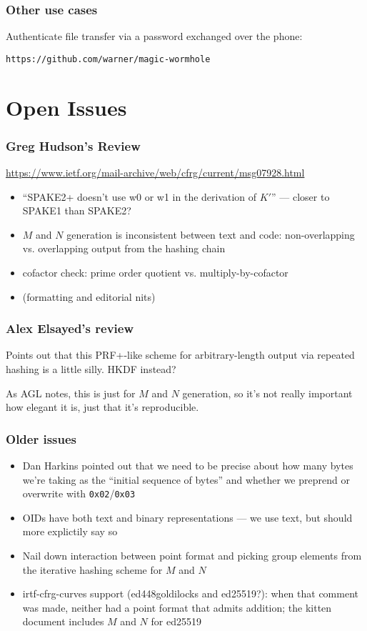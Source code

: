 \documentclass{beamer}
\begin{document}
\begin{frame}[fragile]
\frametitle{Other use cases}
Authenticate file transfer via a password exchanged over the phone:

\verb+https://github.com/warner/magic-wormhole+
\end{frame}

\section{Open Issues}

\begin{frame}[fragile]
\frametitle{Greg Hudson's Review}
\url{https://www.ietf.org/mail-archive/web/cfrg/current/msg07928.html}

\begin{itemize}
\item{``SPAKE2+ doesn't use w0 or w1 in the derivation of $K'$'' --- closer to SPAKE1
than SPAKE2?}
\item{$M$ and $N$ generation is inconsistent between text and code:
non-overlapping vs. overlapping output from the hashing chain}
\item{cofactor check: prime order quotient vs. multiply-by-cofactor}
\item{(formatting and editorial nits)}
\end{itemize}
\end{frame}

\begin{frame}[fragile]
\frametitle{Alex Elsayed's review}
Points out that this PRF+-like scheme for arbitrary-length output via
repeated hashing is a little silly. HKDF instead?

As AGL notes, this is just for $M$ and $N$ generation, so it's not
really important how elegant it is, just that it's reproducible.
\end{frame}

\begin{frame}[fragile]
\frametitle{Older issues}
\begin{itemize}
\item{Dan Harkins pointed out that we need to be precise about how many
bytes we're taking as the ``initial sequence of bytes'' and whether
we preprend or overwrite with \verb+0x02+/\verb+0x03+}
\item{OIDs have both text and binary representations --- we use text, but should
more explictily say so}
\item{Nail down interaction between point format and picking group elements
from the iterative hashing scheme for $M$ and $N$}
\item{irtf-cfrg-curves support (ed448goldilocks and ed25519?): when that
comment was made, neither had a point format that admits addition; the
kitten document includes $M$ and $N$ for ed25519}
\end{itemize}
\end{frame}
\end{document}
